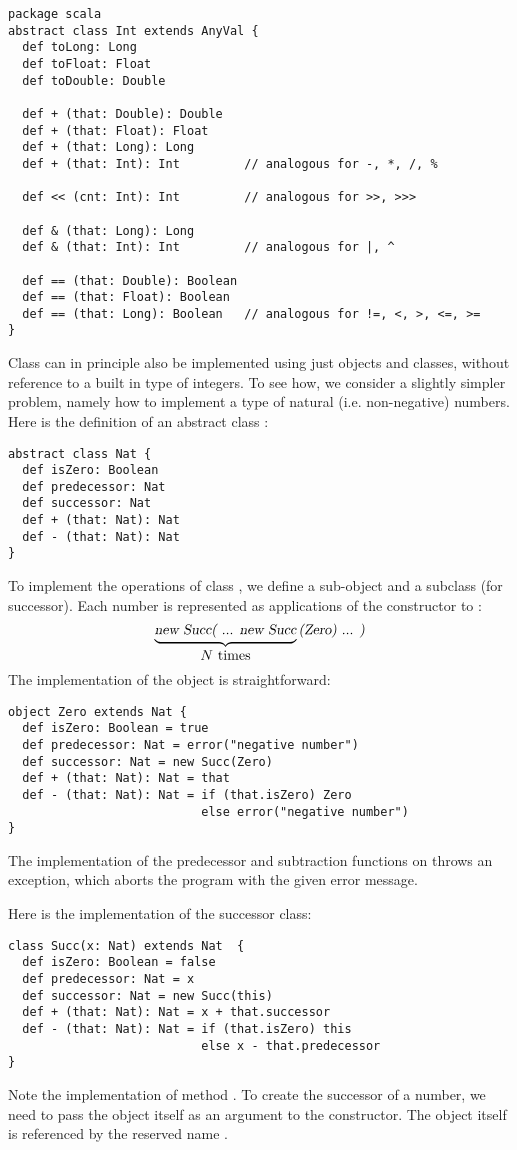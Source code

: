 \begin{lstlisting}
package scala
abstract class Int extends AnyVal {
  def toLong: Long
  def toFloat: Float
  def toDouble: Double

  def + (that: Double): Double
  def + (that: Float): Float
  def + (that: Long): Long
  def + (that: Int): Int         // analogous for -, *, /, %

  def << (cnt: Int): Int         // analogous for >>, >>>

  def & (that: Long): Long
  def & (that: Int): Int         // analogous for |, ^

  def == (that: Double): Boolean
  def == (that: Float): Boolean
  def == (that: Long): Boolean   // analogous for !=, <, >, <=, >=
}
\end{lstlisting}

Class  can in principle also be implemented using just
objects and classes, without reference to a built in type of
integers. To see how, we consider a slightly simpler problem, namely
how to implement a type  of natural (i.e. non-negative)
numbers. Here is the definition of an abstract class :
\begin{lstlisting}
abstract class Nat {
  def isZero: Boolean
  def predecessor: Nat
  def successor: Nat
  def + (that: Nat): Nat
  def - (that: Nat): Nat
}
\end{lstlisting}
To implement the operations of class , we define a sub-object
 and a subclass  (for successor). Each number
 is represented as  applications of the 
constructor to :
\[
\underbrace{\mbox{\sl new Succ( ... new Succ}}_{\mbox{$N$ times}}\mbox{\sl (Zero) ... )}
\]
The implementation of the  object is straightforward:
\begin{lstlisting}
object Zero extends Nat {
  def isZero: Boolean = true
  def predecessor: Nat = error("negative number")
  def successor: Nat = new Succ(Zero)
  def + (that: Nat): Nat = that
  def - (that: Nat): Nat = if (that.isZero) Zero
                           else error("negative number")
}
\end{lstlisting}

The implementation of the predecessor and subtraction functions on
 throws an  exception, which aborts the program
with the given error message.

Here is the implementation of the successor class:
\begin{lstlisting}
class Succ(x: Nat) extends Nat  {
  def isZero: Boolean = false
  def predecessor: Nat = x
  def successor: Nat = new Succ(this)
  def + (that: Nat): Nat = x + that.successor
  def - (that: Nat): Nat = if (that.isZero) this
                           else x - that.predecessor
}
\end{lstlisting}
Note the implementation of method . To create the
successor of a number, we need to pass the object itself as an
argument to the  constructor.  The object itself is
referenced by the reserved name .   

